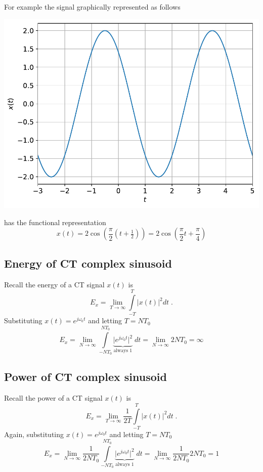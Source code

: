 For example the signal graphically represented as follows
\begin{center}
  \includegraphics[scale=0.6]{graphics/ctsinusoid.pdf}
\end{center}
has the functional representation
\[
x(t) = 2\cos\left(\frac{\pi}{2} (t+\tfrac{1}{2}) \right) =  2\cos\left(\frac{\pi}{2} t +\frac{\pi}{4} \right)
\]

\subsection{Energy of CT complex sinusoid}

Recall the energy of a CT signal $x(t)$ is    
\[
  E_x = \lim_{T\rightarrow\infty} \int\limits_{-T}^T \lvert x(t) \rvert^2 dt \; .
\]
Substituting $x(t) = e^{j\omega_0 t}$ and letting $T = N T_0$
  \[
    E_x = \lim_{N\rightarrow\infty} \int\limits_{-N T_0}^{N T_0} \underbrace{\lvert e^{j\omega_0 t} \rvert^2}_{\text{always 1}} \; dt = \lim_{N\rightarrow\infty} 2NT_0 = \infty
  \]

\subsection{Power of CT complex sinusoid}

Recall the power of a CT signal $x(t)$ is
\[
  E_x = \lim_{T\rightarrow\infty} \frac{1}{2T} \int\limits_{-T}^T \lvert x(t) \rvert^2 dt \; .
\]
Again, substituting $x(t) = e^{j\omega_0 t}$ and letting $T = N T_0$
\[
  E_x = \lim_{N\rightarrow\infty} \frac{1}{2NT_0} \int\limits_{-N T_0}^{N T_0} \underbrace{\lvert e^{j\omega_0 t} \rvert^2}_{\text{always 1}} \; dt = \lim_{N\rightarrow\infty} \frac{1}{2NT_0} 2NT_0 = 1
\]
  
